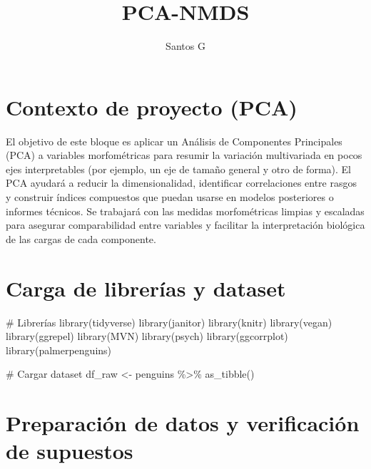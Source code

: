 \documentclass[
  spanish,
  11pt,
  a4paper,
  DIV=11,
  numbers=noendperiod]{scrartcl}
\title{PCA-NMDS}
\author{Santos G}
\date{}
\newenvironment{Shaded}{\begin{snugshade}}{\end{snugshade}}
\newcommand{\CommentTok}[1]{\textcolor[rgb]{0.37,0.37,0.37}{#1}}
\newcommand{\FunctionTok}[1]{\textcolor[rgb]{0.28,0.35,0.67}{#1}}
\newcommand{\NormalTok}[1]{\textcolor[rgb]{0.00,0.23,0.31}{#1}}
\newcommand{\OtherTok}[1]{\textcolor[rgb]{0.00,0.23,0.31}{#1}}
\newcommand{\SpecialCharTok}[1]{\textcolor[rgb]{0.37,0.37,0.37}{#1}}
\renewcommand*\contentsname{Tabla de contenidos}
\newcommand\contentsname{Tabla de contenidos}
\begin{document}
\maketitle

\renewcommand*\contentsname{Tabla de contenidos}
{
\hypersetup{linkcolor=}
\setcounter{tocdepth}{2}
\tableofcontents
}

\section{Contexto de proyecto (PCA)}\label{contexto-de-proyecto-pca}

El objetivo de este bloque es aplicar un Análisis de Componentes
Principales (PCA) a variables morfométricas para resumir la variación
multivariada en pocos ejes interpretables (por ejemplo, un eje de tamaño
general y otro de forma). El PCA ayudará a reducir la dimensionalidad,
identificar correlaciones entre rasgos y construir índices compuestos
que puedan usarse en modelos posteriores o informes técnicos. Se
trabajará con las medidas morfométricas limpias y escaladas para
asegurar comparabilidad entre variables y facilitar la interpretación
biológica de las cargas de cada componente.

\section{Carga de librerías y
dataset}\label{carga-de-libreruxedas-y-dataset}

\begin{Shaded}
\begin{Highlighting}[numbers=left,,]
\CommentTok{\# Librerías}
\FunctionTok{library}\NormalTok{(tidyverse)}
\FunctionTok{library}\NormalTok{(janitor)}
\FunctionTok{library}\NormalTok{(knitr)}
\FunctionTok{library}\NormalTok{(vegan)}
\FunctionTok{library}\NormalTok{(ggrepel) }
\FunctionTok{library}\NormalTok{(MVN)}
\FunctionTok{library}\NormalTok{(psych)}
\FunctionTok{library}\NormalTok{(ggcorrplot)}
\FunctionTok{library}\NormalTok{(palmerpenguins) }

\CommentTok{\# Cargar dataset}
\NormalTok{df\_raw }\OtherTok{\textless{}{-}}\NormalTok{ penguins }\SpecialCharTok{\%\textgreater{}\%} \FunctionTok{as\_tibble}\NormalTok{()}
\end{Highlighting}
\end{Shaded}

\section{Preparación de datos y verificación de
supuestos}\label{preparaciuxf3n-de-datos-y-verificaciuxf3n-de-supuestos}
\end{document}
